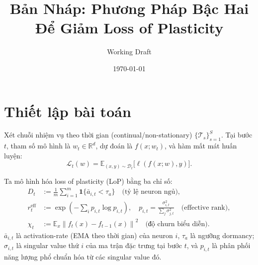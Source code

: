 \documentclass[11pt]{article}
\title{Bản Nháp: Phương Pháp Bậc Hai Để Giảm Loss of Plasticity}
\author{Working Draft}
\date{\today}
\newcommand{\R}{\mathbb{R}}
\newcommand{\E}{\mathbb{E}}
\newcommand{\norm}[1]{\left\lVert #1 \right\rVert}
\begin{document}
\maketitle

\section{Thiết lập bài toán}
Xét chuỗi nhiệm vụ theo thời gian (continual/non-stationary) $\{\mathcal{T}_s\}_{s=1}^S$.
Tại bước $t$, tham số mô hình là $w_t \in \R^d$, dự đoán là $f(x;w_t)$, và hàm mất mát huấn luyện:
\begin{equation}
\mathcal{L}_t(w) = \E_{(x,y)\sim \mathcal{D}_t}\big[\ell(f(x;w),y)\big].
\end{equation}

Ta mô hình hóa loss of plasticity (LoP) bằng ba chỉ số:
\begin{align}
D_t &:= \frac{1}{m}\sum_{i=1}^{m} \mathbf{1}\{\bar a_{i,t} < \tau_a\}
\quad\text{(tỷ lệ neuron ngủ)},\\
r_t^{\mathrm{eff}} &:= \exp\!\left(-\sum_i p_{i,t}\log p_{i,t}\right),\quad p_{i,t}=\frac{\sigma_{i,t}^2}{\sum_j \sigma_{j,t}^2}
\quad\text{(effective rank)},\\
\chi_t &:= \E_x\norm{f_t(x)-f_{t-1}(x)}^2
\quad\text{(độ churn biểu diễn)}.
\end{align}
$\bar a_{i,t}$ là activation-rate (EMA theo thời gian) của neuron $i$, $\tau_a$ là ngưỡng dormancy;
$\sigma_{i,t}$ là singular value thứ $i$ của ma trận đặc trưng tại bước $t$, và $p_{i,t}$ là phân phối năng lượng phổ chuẩn hóa từ các singular value đó.
\end{document}
